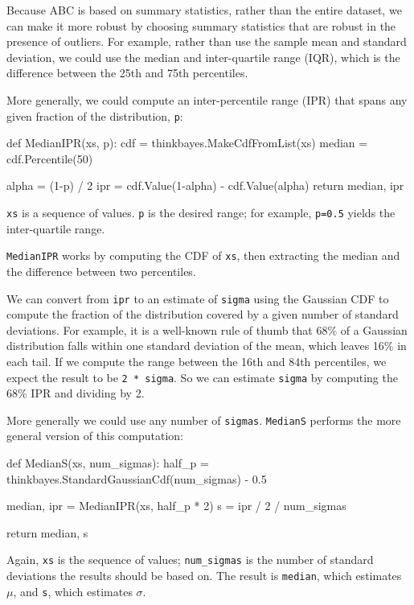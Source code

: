 \documentclass[12pt]{book}
\theoremstyle{exercise}
\begin{document}
Because ABC is based on summary statistics, rather than the entire
dataset, we can make it more robust by choosing summary statistics
that are robust in the presence of outliers.  For example, rather
than use the sample mean and standard deviation, we could use the median
and inter-quartile range
(IQR), which is the difference between the 25th and 75th percentiles.

More generally, we could compute an inter-percentile range (IPR) that
spans any given fraction of the distribution, {\tt p}:

\begin{code}
def MedianIPR(xs, p):
    cdf = thinkbayes.MakeCdfFromList(xs)
    median = cdf.Percentile(50)

    alpha = (1-p) / 2
    ipr = cdf.Value(1-alpha) - cdf.Value(alpha)
    return median, ipr
\end{code}

{\tt xs} is a sequence of values.  {\tt p} is the desired range;
for example, {\tt p=0.5} yields the inter-quartile range.

{\tt MedianIPR} works by computing the CDF of {\tt xs},
then extracting the median and the difference between two
percentiles.

We can convert from {\tt ipr} to an estimate of {\tt sigma} using the
Gaussian CDF to compute the fraction of the distribution covered by a
given number of standard deviations.  For example, it is a well-known
rule of thumb that 68\% of a Gaussian distribution falls within one
standard deviation of the mean, which leaves 16\% in each tail.  If we
compute the range between the 16th and 84th percentiles, we expect the
result to be {\tt 2 * sigma}.  So we can estimate {\tt sigma} by
computing the 68\% IPR and dividing by 2.

More generally we could use any number of {\tt sigmas}.
{\tt MedianS} performs the more general version of this
computation:

\begin{code}
def MedianS(xs, num_sigmas):
    half_p = thinkbayes.StandardGaussianCdf(num_sigmas) - 0.5

    median, ipr = MedianIPR(xs, half_p * 2)
    s = ipr / 2 / num_sigmas

    return median, s
\end{code}

Again, {\tt xs} is the sequence of values; \verb"num_sigmas" is the
number of standard deviations the results should be based on.  The
result is {\tt median}, which estimates $\mu$, and {\tt s}, which 
estimates $\sigma$.
\end{document}
